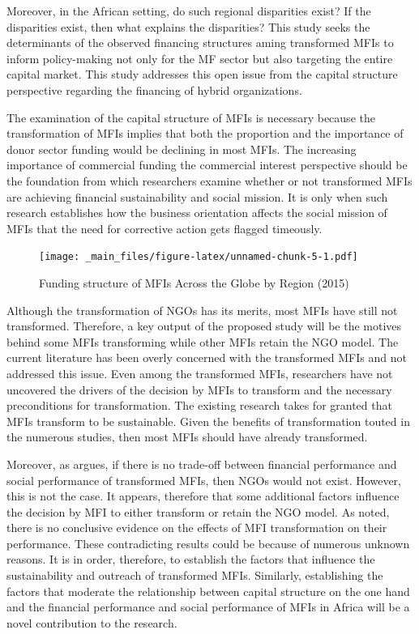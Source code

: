 \documentclass[a4paper, nobind]{templates/ociamthesis}
\begin{document}
Moreover, in the African setting, do such regional disparities exist? If the disparities exist, then what explains the disparities? This study seeks the determinants of the observed financing structures aming transformed MFIs to inform policy-making not only for the MF sector but also targeting the entire capital market. This study addresses this open issue from the capital structure perspective regarding the financing of hybrid organizations.

The examination of the capital structure of MFIs is necessary because the transformation of MFIs implies that both the proportion and the importance of donor sector funding would be declining in most MFIs. The increasing importance of commercial funding the commercial interest perspective should be the foundation from which researchers examine whether or not transformed MFIs are achieving financial sustainability and social mission. It is only when such research establishes how the business orientation affects the social mission of MFIs that the need for corrective action gets flagged timeously.

\begin{figure}
\centering
\texttt{[image: \_main\_files/figure-latex/unnamed-chunk-5-1.pdf]}
\caption{\label{fig:unnamed-chunk-5}Funding structure of MFIs Across the Globe by Region (2015)}
\end{figure}

Although the transformation of NGOs has its merits, most MFIs have still not transformed\autocite{d2017ngos}. Therefore, a key output of the proposed study will be the motives behind some MFIs transforming while other MFIs retain the NGO model. The current literature has been overly concerned with the transformed MFIs and not addressed this issue. Even among the transformed MFIs, researchers have not uncovered the drivers of the decision by MFIs to transform and the necessary preconditions for transformation. The existing research takes for granted that MFIs transform to be sustainable. Given the benefits of transformation touted in the numerous studies, then most MFIs should have already transformed.

Moreover, as \textcite{morduch2019challenges} argues, if there is no trade-off between financial performance and social performance of transformed MFIs, then NGOs would not exist. However, this is not the case. It appears, therefore that some additional factors influence the decision by MFI to either transform or retain the NGO model. As noted, there is no conclusive evidence on the effects of MFI transformation on their performance. These contradicting results could be because of numerous unknown reasons. It is in order, therefore, to establish the factors that influence the sustainability and outreach of transformed MFIs. Similarly, establishing the factors that moderate the relationship between capital structure on the one hand and the financial performance and social performance of MFIs in Africa will be a novel contribution to the research.
\end{document}
